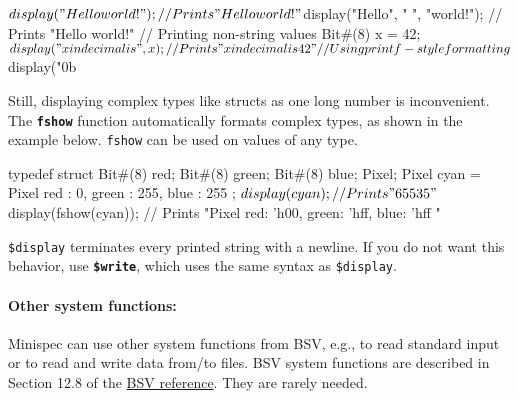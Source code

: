 \begin{mscode}
$display("Hello world!");                 // Prints "Hello world!"
$display("Hello", " ", "world!");         // Prints "Hello world!"
// Printing non-string values
Bit#(8) x = 42;
$display("x in decimal is ", x);          // Prints "x in decimal is 42"
// Using printf-style formatting
$display("0b%
\end{mscode}

Still, displaying complex types like structs as one long number is inconvenient.
The \textbf{\texttt{fshow}} function automatically formats complex types, as shown in the example below.
\texttt{fshow} can be used on values of any type.

\begin{mscode}
typedef struct { Bit#(8) red; Bit#(8) green; Bit#(8) blue; } Pixel;
Pixel cyan = Pixel{ red : 0, green : 255, blue : 255 };
$display(cyan);         // Prints "   65535"
$display(fshow(cyan));  // Prints "Pixel { red: 'h00, green: 'hff, blue: 'hff }"
\end{mscode}

\texttt{\$display} terminates every printed string with a newline. If you do not want this behavior, use \textbf{\texttt{\$write}},
which uses the same syntax as \texttt{\$display}.

\paragraph{Other system functions:} Minispec can use other system functions from BSV,
e.g., to read standard input or to read and write data from/to files.
BSV system functions are described in Section 12.8 of the
\href{http://csg.csail.mit.edu/6.S078/6_S078_2012_www/resources/reference-guide.pdf}{BSV reference}.
They are rarely needed.
